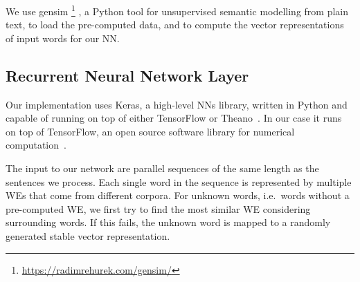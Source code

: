 \documentclass[11pt,a4paper]{article}
\begin{document}

We use gensim%
\footnote{\url{https://radimrehurek.com/gensim/}}%
, a Python tool for unsupervised semantic modelling from plain text, to load
the pre-computed data, and to compute the vector representations of
input words for our NN.

\subsection{Recurrent Neural Network Layer} %

Our implementation uses Keras, a high-level NNs library, written in Python and
capable of running on top of either TensorFlow or Theano~\cite{chollet2015}. 
In our case it runs on top of TensorFlow, an open source software library for numerical computation~\cite{tensorflow2015-whitepaper}.

The input to our network are parallel sequences of the same length as the sentences we
process.
Each single word in the sequence is represented by multiple WEs that come from different corpora. %
For unknown words, i.e.~words without a pre-computed WE, we first try to
find the most similar WE considering %
surrounding words.  
If this fails, the unknown word is mapped to a randomly generated stable vector
representation.
\end{document}
